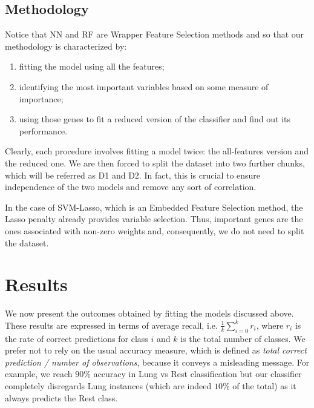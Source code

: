 \documentclass[a4paper,11pt, oneside]{article}  %
\begin{document}
\subsection{Methodology}
Notice that NN and RF are Wrapper Feature Selection methods and so that our methodology is characterized by:
\begin{enumerate}
	\item fitting the model using all the features;
	\item identifying the most important variables based on some measure of importance; 
	\item using those genes to fit a reduced version of the classifier and find out its performance.
\end{enumerate} 
Clearly, each procedure involves fitting a model twice: the all-features version and the reduced one.  We are then forced to split the dataset into two further chunks, which will be referred as D1 and D2. In fact, this is crucial to ensure independence of the two models and remove any sort of correlation.

In the case of SVM-Lasso, which is an Embedded Feature Selection method, the Lasso penalty already provides variable selection. Thus, important genes are the ones associated with non-zero weights and, consequently, we do not need to split the dataset. 

\section{Results}
We now present the outcomes obtained by fitting the models discussed above. \\
These results are expressed in terms of average recall, i.e. $\frac{1}{k} \sum\limits_{i = 0 }^k r_i$, where $r_i$ is the rate of correct predictions for class $i$ and $k$ is the total number of classes. We prefer not to rely on the usual accuracy measure,  which is defined as \textit{total correct prediction / number of observations}, because it conveys a misleading message. For example,  we reach $90\%$ accuracy in Lung vs Rest classification but our classifier completely disregards Lung instances (which are indeed $10\%$ of the total) as it always predicts the Rest class.  
\end{document}
